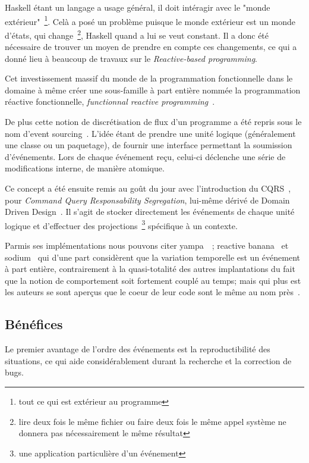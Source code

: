 \documentclass{article}
\begin{document}
Haskell étant un langage a usage général, il doit intéragir avec le "monde extérieur"~\footnote{tout ce qui est extérieur au programme}.
Celà a posé un problème puisque le monde extérieur est un monde d'états, qui change~\footnote{lire deux fois le même fichier ou faire deux fois le même appel système ne donnera pas nécessairement le même résultat},
Haskell quand a lui se veut constant.
Il a donc été nécessaire de trouver un moyen de prendre en compte ces changements,
ce qui a donné lieu à beaucoup de travaux sur le \emph{Reactive-based programming}.

Cet investissement massif du monde de la programmation fonctionnelle
dans le domaine à même créer une sous-famille à part entière nommée la
programmation réactive fonctionnelle, \emph{functionnal reactive programming}~\cite{frp}.

De plus cette notion de discrétisation de flux d'un programme a été repris
sous le nom d'event sourcing~\cite{eventsourcing}. 
L'idée étant de prendre une unité logique (généralement une classe ou un paquetage),
de fournir une interface permettant la soumission d'événements. Lors de chaque événement
reçu, celui-ci déclenche une série de modifications interne, de manière atomique.

Ce concept a été ensuite remis au goût du jour avec l'introduction du CQRS~\cite{cqrs}, pour \emph{Command Query
Responsability Segregation}, lui-même dérivé de Domain Driven Design~\cite{ddd}.
Il s'agit de stocker directement les événements de chaque unité logique et d'effectuer
des projections~\footnote{une application particulière d'un événement} spécifique à un contexte.

Parmis ses implémentations nous pouvons citer yampa~\cite{yampa}~\cite{arrows};
reactive banana~\cite{reactivebanana} et sodium~\cite{sodium} qui d'une part considèrent que
la variation temporelle est un événement à part entière, contrairement à
la quasi-totalité des autres implantations du fait que la notion de
comportement soit fortement couplé au temps; mais qui plus est les
auteurs se sont aperçus que le coeur de leur code sont le même au nom
près~\cite{sodium_talk}.

\subsection{Bénéfices}\label{bénéfices-1}

Le premier avantage de l'ordre des événements est la reproductibilité
des situations, ce qui aide considérablement durant la recherche et la
correction de bugs.
\end{document}
